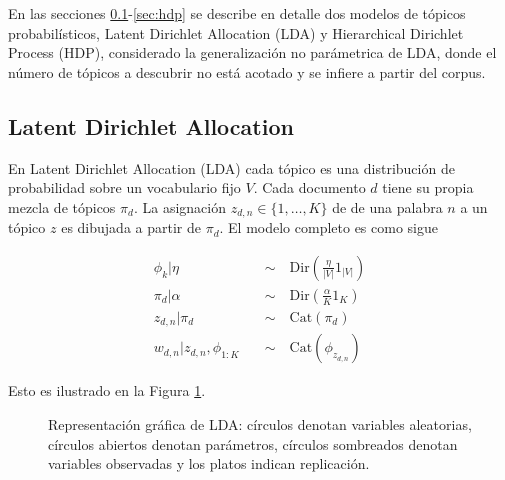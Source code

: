 En las secciones \ref{sec:lda}-\ref{sec:hdp} se describe en detalle dos modelos de tópicos probabilísticos, Latent Dirichlet Allocation (LDA) y Hierarchical Dirichlet Process (HDP), considerado la generalización no parámetrica de LDA, donde el número de tópicos a descubrir no está acotado y se infiere a partir del corpus.\\

\subsection{Latent Dirichlet Allocation}
\label{sec:lda}

En Latent Dirichlet Allocation (LDA) \citep{blei2003latent} cada tópico es una distribución de probabilidad sobre un vocabulario fijo $V$. Cada documento $d$ tiene su propia mezcla de tópicos $\pi_{d}$. La asignación $z_{d,n}\in\{1, \ldots, K\}$  de de una palabra $n$ a un tópico $z$ es dibujada a partir de $\pi_{d}$. El modelo completo es como sigue

\begin{align}
    \phi_{k}|\eta \quad & \sim\quad \text{Dir}(\frac{\eta}{|V|}1_{|V|})\\
    \pi_{d}|\alpha \quad & \sim \quad \text{Dir}(\frac{\alpha}{K}1_{K})\\
    z_{d,n}|\pi_{d} \quad & \sim \quad \text{Cat}(\pi_{d})\\
    w_{d,n}|z_{d,n}, \phi_{1:K} \quad & \sim \quad \text{Cat}(\phi_{z_{d,n}})
\end{align}

Esto es ilustrado en la Figura \ref{img:lda}.
\begin{figure}
  \centering
\caption{Representación gráfica de LDA: círculos denotan variables aleatorias, círculos abiertos denotan parámetros, círculos sombreados denotan variables observadas y los platos indican replicación.}
\label{img:lda}
\end{figure}

